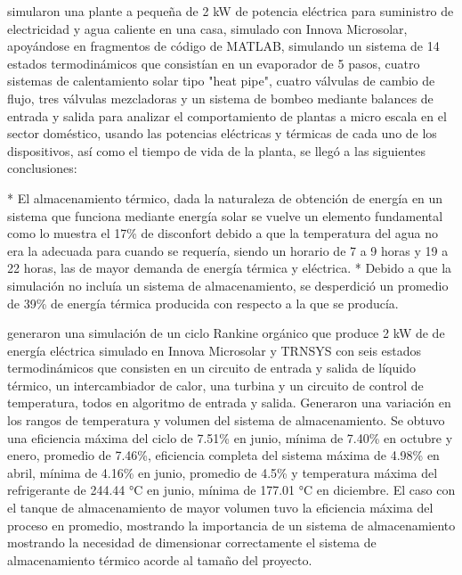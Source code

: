 \textcite{ARTECONI20192225} simularon una plante a pequeña de 2 kW de potencia eléctrica para suministro de electricidad y agua caliente en una casa, simulado con Innova Microsolar, apoyándose en fragmentos de código de MATLAB, simulando un sistema de 14 estados termodinámicos que consistían en un evaporador de 5 pasos, cuatro sistemas de calentamiento solar tipo "heat pipe", cuatro válvulas de cambio de flujo, tres válvulas mezcladoras y un sistema de bombeo mediante balances de entrada y salida para analizar el comportamiento de plantas a micro escala en el sector doméstico, usando las potencias eléctricas y térmicas de cada uno de los dispositivos, así como el tiempo de vida de la planta, se llegó a las siguientes conclusiones:

\begin{markdown}
* El almacenamiento térmico, dada la naturaleza de obtención de energía en un sistema que funciona mediante energía solar se vuelve un elemento fundamental como lo muestra el 17\% de disconfort debido a que la temperatura del agua no era la adecuada para cuando se requería, siendo un horario de 7 a 9 horas y 19 a 22 horas, las de mayor demanda de energía térmica y eléctrica.
* Debido a que la simulación no incluía un sistema de almacenamiento, se desperdició un promedio de 39\% de energía térmica producida con respecto a la que se producía.
\end{markdown}

\textcite{CIOCCOLANTI20171629} generaron una simulación de un ciclo Rankine orgánico que produce 2 kW de de energía eléctrica simulado en Innova Microsolar y TRNSYS con seis estados termodinámicos que consisten en un circuito de entrada y salida de líquido térmico, un intercambiador de calor, una turbina y un circuito de control de temperatura, todos en algoritmo de entrada y salida. Generaron una variación en los rangos de temperatura y volumen del sistema de almacenamiento. Se obtuvo una eficiencia máxima del ciclo de 7.51\% en junio, mínima de 7.40\% en octubre y enero, promedio de 7.46\%, eficiencia completa del sistema máxima de 4.98\% en abril, mínima de 4.16\% en junio, promedio de 4.5\% y temperatura máxima del refrigerante de 244.44 °C en junio, mínima de 177.01 °C en diciembre. El caso con el tanque de almacenamiento de mayor volumen tuvo la eficiencia máxima del proceso en promedio, mostrando la importancia de un sistema de almacenamiento mostrando la necesidad de dimensionar correctamente el sistema de almacenamiento térmico acorde al tamaño del proyecto.

